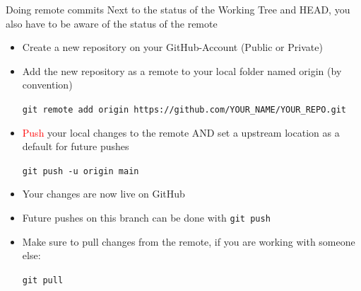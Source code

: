 \documentclass[en]{sdqbeamer}
\begin{document}
\begin{frame}{Doing remote commits}
Next to the status of the Working Tree and HEAD, you also have to be aware of the status of the remote
\begin{itemize}
    \item Create a new repository on your GitHub-Account (Public or Private)
    \item Add the new repository as a remote to your local folder named origin (by convention)
    
        \lstinline{git remote add origin https://github.com/YOUR_NAME/YOUR_REPO.git}

    \item \textcolor{red}{Push} your local changes to the remote AND set a upstream location as a default for future pushes

        \lstinline{git push -u origin main}

    \item[$\rightarrow$] Your changes are now live on GitHub
    \item Future pushes on this branch can be done with \lstinline{git push}
    \item Make sure to pull changes from the remote, if you are working with someone else:
    
        \lstinline{git pull}
\end{itemize}
\end{frame}
\end{document}
